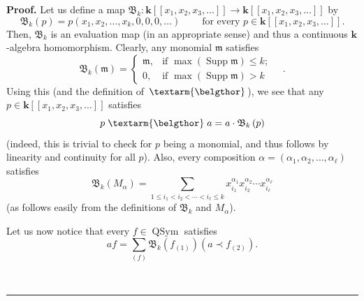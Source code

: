 \documentclass
[numbers=enddot,12pt,final,onecolumn,notitlepage,abstracton]{scrartcl}%
\theoremstyle{definition}
\newenvironment{proof}[1][Proof]{\noindent\textbf{#1.} }{\ \rule{0.5em}{0.5em}}
\newenvironment{vershort}{}{}
\newcommand{\bel}{\left. \textarm{\belgthor} \right.}
\let\sumnonlimits\sum
\renewcommand{\sum}{\sumnonlimits\limits}
\begin{document}
\begin{proof}
\begin{vershort}
Let us define a map $\mathfrak{B}_{k}:\mathbf{k}\left[  \left[  x_{1}%
,x_{2},x_{3},\ldots\right]  \right]  \rightarrow\mathbf{k}\left[  \left[
x_{1},x_{2},x_{3},\ldots\right]  \right]  $ by%
\[
\mathfrak{B}_{k}\left(  p\right)  =p\left(  x_{1},x_{2},\ldots,x_{k}%
,0,0,0,\ldots\right)  \ \ \ \ \ \ \ \ \ \ \text{for every }p\in\mathbf{k}%
\left[  \left[  x_{1},x_{2},x_{3},\ldots\right]  \right]  .
\]
Then, $\mathfrak{B}_{k}$ is an evaluation map (in an appropriate sense) and
thus a continuous $\mathbf{k}$-algebra homomorphism. Clearly, any monomial
$\mathfrak{m}$ satisfies%
\begin{equation}
\mathfrak{B}_{k}\left(  \mathfrak{m}\right)  =%
\begin{cases}
\mathfrak{m}, & \text{if }\max\left(  \operatorname*{Supp}\mathfrak{m}\right)
\leq k;\\
0, & \text{if }\max\left(  \operatorname*{Supp}\mathfrak{m}\right)  >k
\end{cases}
\quad. \label{pf.thm.beldend.short.monom}%
\end{equation}
Using this (and the definition of $\bel$), we see that any $p\in
\mathbf{k}\left[  \left[  x_{1},x_{2},x_{3},\ldots\right]  \right]  $
satisfies%
\begin{equation}
p\bel a=a\cdot\mathfrak{B}_{k}\left(  p\right)  \label{pf.thm.beldend.short.B}%
\end{equation}
(indeed, this is trivial to check for $p$ being a monomial, and thus follows
by linearity and continuity for all $p$). Also, every composition
$\alpha=\left(  \alpha_{1},\alpha_{2},\ldots,\alpha_{\ell}\right)  $ satisfies%
\begin{equation}
\mathfrak{B}_{k}\left(  M_{\alpha}\right)  =\sum_{1\leq i_{1}<i_{2}%
<\cdots<i_{\ell}\leq k}x_{i_{1}}^{\alpha_{1}}x_{i_{2}}^{\alpha_{2}}\cdots
x_{i_{\ell}}^{\alpha_{\ell}} \label{pf.thm.beldend.short.Malpha-bel-a}%
\end{equation}
(as follows easily from the definitions of $\mathfrak{B}_{k}$ and $M_{\alpha}$).

Let us now notice that every $f\in\operatorname*{QSym}$ satisfies%
\begin{equation}
af=\sum_{\left(  f\right)  }\mathfrak{B}_{k}\left(  f_{\left(  1\right)
}\right)  \left(  a\left.  \prec\right.  f_{\left(  2\right)  }\right)  .
\label{pf.thm.beldend.short.mainlem}%
\end{equation}



\end{vershort}
\end{proof}
\end{document}
